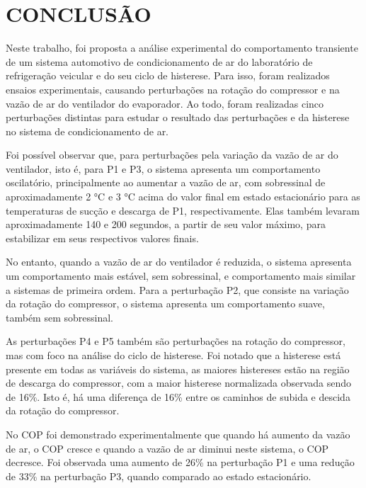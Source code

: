 \section{CONCLUSÃO}

Neste trabalho, foi proposta a análise experimental do comportamento transiente de um sistema automotivo de condicionamento de ar do laboratório de refrigeração veicular \textcite{reve2023} e do seu ciclo de histerese. Para isso, foram realizados ensaios experimentais, causando perturbações na rotação do compressor e na vazão de ar do ventilador do evaporador. Ao todo, foram realizadas cinco perturbações distintas para estudar o resultado das perturbações e da histerese no sistema de condicionamento de ar. 

Foi possível observar que, para perturbações pela variação da vazão de ar do ventilador, isto é, para P1 e P3, o sistema apresenta um comportamento oscilatório, principalmente ao aumentar a vazão de ar, com sobressinal de aproximadamente 2 °C e 3 °C acima do valor final em estado estacionário para as temperaturas de sucção e descarga de P1, respectivamente. Elas também levaram aproximadamente 140 e 200 segundos, a partir de seu valor máximo, para estabilizar em seus respectivos valores finais. 

No entanto, quando a vazão de ar do ventilador é reduzida, o sistema apresenta um comportamento mais estável, sem sobressinal, e comportamento mais similar a sistemas de primeira ordem. Para a perturbação P2, que consiste na variação da rotação do compressor, o sistema apresenta um comportamento suave, também sem sobressinal. 

As perturbações P4 e P5 também são perturbações na rotação do compressor, mas com foco na análise do ciclo de histerese. Foi notado que a histerese está presente em todas as variáveis do sistema, as maiores histereses estão na região de descarga do compressor, com a maior histerese normalizada observada sendo de 16\%. Isto é, há uma diferença de 16\% entre os caminhos de subida e descida da rotação do compressor. 

No COP foi demonstrado experimentalmente que quando há aumento da vazão de ar, o COP cresce e quando a vazão de ar diminui neste sistema, o COP decresce. Foi observada uma aumento de 26\% na perturbação P1 e uma redução de 33\% na perturbação P3, quando comparado ao estado estacionário. 

